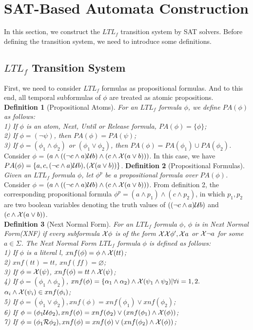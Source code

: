\section{SAT-Based Automata Construction}
In this section, we construct the $LTL_f$ transition system by SAT solvers. Before defining the transition system, we need to introduce some definitions.\\
\subsection{$LTL_f$ Transition System}
First, we need to consider $LTL_f$ formulas as propositional formulas. And to this end, all temporal subformulas of $\phi$ are treated as atomic propositions. \\
{\bf Definition 1} (Propositional Atoms). {\it For an $LTL_f$ formula $\phi$, we define $PA(\phi)$ as follows:\\
1) If $\phi$ is an atom, Next, Until or Release formula, $PA(\phi)=\{\phi\}$;\\
2) If $\phi = (\neg \psi)$, then $PA(\phi)= PA(\psi)$;\\
3) If $\phi = (\phi_1 \wedge \phi_2)$ or $(\phi_1 \vee \phi_2)$, then $PA(\phi) = PA(\phi_1) \cup PA(\phi_2)$.
}     \\
Consider $\phi$ = $(a \wedge ((\neg c \wedge a)\mathcal{U} b) \wedge (c \wedge \mathcal{X} (a \vee b)))$. In this case, we have $PA(\phi)=\{a, c, (\neg c \wedge a)\mathcal{U} b), (\mathcal{X} (a \vee b))\}$. 
{\bf Definition 2} (Propositional Formulas). {\it Given an $LTL_f$ formula $\phi$, let $\phi^{p}$ be a propositional formula over $PA(\phi)$. \\}
Consider  $\phi$ = $(a \wedge ((\neg c \wedge a)\mathcal{U} b) \wedge (c \wedge \mathcal{X} (a \vee b)))$. From definition 2, the corresponding propositional formula $\phi^p = (a \wedge p_1) \wedge (c \wedge p_2)$, in which $p_1, p_2$ are two boolean variables denoting the truth values of $((\neg c \wedge a)\mathcal{U} b)$ and $(c \wedge \mathcal{X} (a \vee b))$. \\
{\bf Definition 3} (Next Normal Form). {\it For an $LTL_f$ formula $\phi$, $\phi$ is in Next Normal Form(XNF) if every subformula $\mathcal{X} \phi$ is of the form $\mathcal{X} \mathcal{X} \phi^{\prime}, \mathcal{X} a$ or $\mathcal{X} \neg a$ for some $a \in \Sigma$. The Next Normal Form $LTL_f$ formula $\phi$ is defined as follows:\\ 
1) If $\phi$ is a literal l, $xnf(\phi) = \phi \wedge \mathcal{X}(tt)$;\\
2)  $xnf(tt) =  tt$, $xnf(ff) =  \varnothing$;\\
3) If $\phi = \mathcal{X}(\psi)$, $xnf(\phi) = tt \wedge \mathcal{X}(\psi) $;\\
4) If $\phi = (\phi_1 \wedge \phi_2)$, $xnf(\phi) = \{\alpha_1 \wedge \alpha_2)\wedge \mathcal{X}(\psi_1 \wedge \psi_2)| \forall i = 1,2.$ $\alpha_i \wedge \mathcal{X}(\psi_i)\in xnf(\phi_i)$; \\
5) If $\phi = (\phi_1 \vee \phi_2), xnf(\phi) = xnf(\phi_1)\vee xnf(\phi_2)$; \\
6) If $\phi = (\phi_1 \mathcal{U} \phi_2), xnf(\phi) = xnf(\phi_2) \vee (xnf(\phi_1) \wedge \mathcal{X}(\phi))$; \\
7) If $\phi = (\phi_1 \mathcal{R} \phi_2), xnf(\phi) = xnf(\phi)\vee (xnf(\phi_2) \wedge \mathcal{X}(\phi))$; \\
}    
